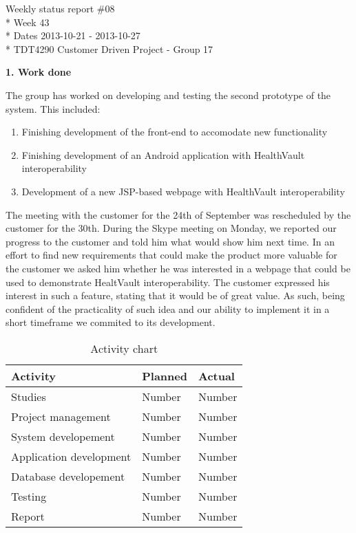 \begin{center}
Weekly status report \#08\\*
Week 43 \\*
Dates 2013-10-21 - 2013-10-27 \\*
TDT4290 Customer Driven Project - Group 17
\end{center}

\textbf{1. Work done}

The group has worked on developing and testing the second prototype of the system.
This included:

\begin{enumerate}
\item Finishing development of the front-end to accomodate new functionality
\item Finishing development of an Android application with HealthVault interoperability
\item Development of a new JSP-based webpage with HealthVault interoperability
\end{enumerate}

The meeting with the customer for the 24th of September was rescheduled by the customer for the 30th. 
During the Skype meeting on Monday, we reported our progress to the customer and told him what would show him next time. 
In an effort to find new requirements that could make the product more valuable for the customer we asked him whether he was interested in a webpage that could be used to demonstrate HealtVault interoperability.
The customer expressed his interest in such a feature, stating that it would be of great value.
As such, being confident of the practicality of such idea and our ability to implement it in a short timeframe we commited to its development. 


\begin{table}[H]
\begin{center}
\begin{tabular}{ l | l | l }
  \hline
  Activity & Planned & Actual \\
  \hline\noalign{\smallskip}\noalign{\smallskip}\hline
  Studies & Number & Number \\
  Project management & Number & Number \\
  System developement & Number & Number \\
  Application development & Number & Number \\
  Database developement & Number & Number \\
  Testing & Number & Number \\
  Report & Number & Number \\
  \hline
\end{tabular}
\end{center}
\caption{Activity chart}
\label{table:activityChartStatusReportWeek43}
\end{table}

